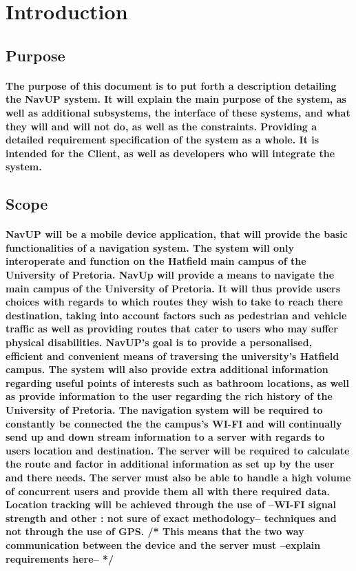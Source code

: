 \documentclass{article}
\begin{document}
	\newpage
	
	\section{Introduction}
    	
        \subsection{Purpose}
        	\paragraph{The purpose of this document is to put forth a description detailing the NavUP system. It will explain the main purpose of the system, as well as additional subsystems, the interface of these systems, and what they will and will not do, as well as the constraints. Providing a detailed requirement specification of the system as a whole. It is intended for the Client, as well as developers who will integrate the system.}
    	\subsection{Scope}

        	\paragraph{NavUP will be a mobile device application, that will provide the basic functionalities of a navigation system. The system will only interoperate and function on the Hatfield main campus of the University of Pretoria.  	NavUp will provide a means to navigate the main campus of the University of Pretoria. It will thus provide users choices with regards to which routes they wish to take to reach there destination, taking into account factors such as pedestrian and vehicle traffic as well as providing routes that cater to users who may suffer physical disabilities.  NavUP's goal is to provide a personalised, efficient and convenient means of traversing the university's Hatfield campus. The system will also provide extra additional information regarding useful points of interests such as bathroom locations, as well as provide information to the user regarding the rich history of the University of Pretoria. The navigation system will be required to constantly be connected the the campus's WI-FI and will continually send up and down stream information to a server with regards to users location and destination. The server will be required to calculate the route and factor in additional information as set up by the user and there needs. The server must also be able to handle a high volume of concurrent users and provide them all with there required data. Location tracking will be achieved through the use of --WI-FI signal strength and other : not sure of exact methodology-- techniques and not through the use of GPS. /* This means that the two way communication between the device and the server must --explain requirements here-- */ }
\end{document}
